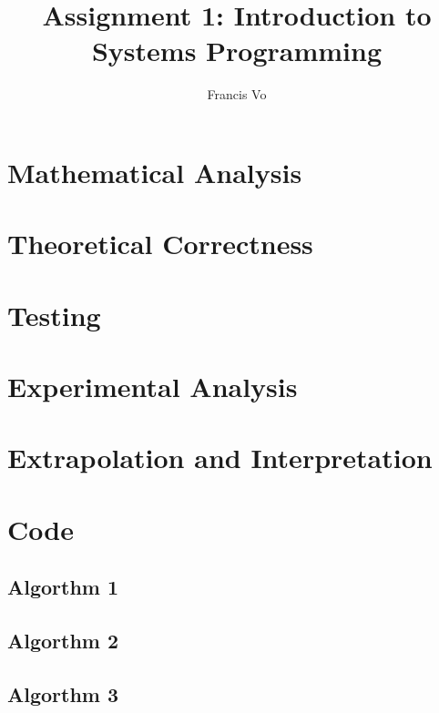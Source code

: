 \documentclass[a4paper,10pt]{article}
\title{Assignment 1: Introduction to Systems Programming}
\author{Francis Vo}
\begin{document}
	\maketitle

	\section{Mathematical Analysis}

	\section{Theoretical Correctness}

	\section{Testing}

	\section{Experimental Analysis}

	\section{Extrapolation and Interpretation}

	\section{Code}
		\subsection{Algorthm 1}
		
		\subsection{Algorthm 2}
		
		\subsection{Algorthm 3}
		
\end{document}
